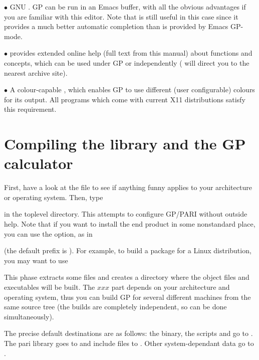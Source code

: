   $\bullet$ GNU . GP can be run in an Emacs buffer, with all the
obvious advantages if you are familiar with this editor. Note that
 is still useful in this case since it provides a much better
automatic completion than is provided by Emacs GP-mode.

  $\bullet$  provides extended online help (full text from this
manual) about functions and concepts, which can be used under GP or
independently ( will direct you to the nearest
 archive site).

  $\bullet$ A colour-capable , which enables GP to use different
(user configurable) colours for its output. All  programs which
come with current X11 distributions satisfy this requirement. \vfill\eject
\section{Compiling the library and the GP calculator}

 First, have a look at the  file
to see if anything funny applies to your architecture or operating system.
Then, type 


\noindent in the toplevel directory. This attempts to configure GP/PARI
without outside help. Note that if you want to install the end product in
some nonstandard place, you can use the  option, as in


\noindent (the default prefix is ). For example, to build a
package for a Linux distribution, you may want to use


This phase extracts some files and creates a directory  where the
object files and executables will be built. The $xxx$ part depends on your
architecture and operating system, thus you can build GP for several
different machines from the same source tree (the builds are completely
independent, so can be done simultaneously).

 The precise default destinations are as follows:
the  binary, the scripts  and  go to
. The pari library goes to  and include
files to . Other system-dependant data go to
.

